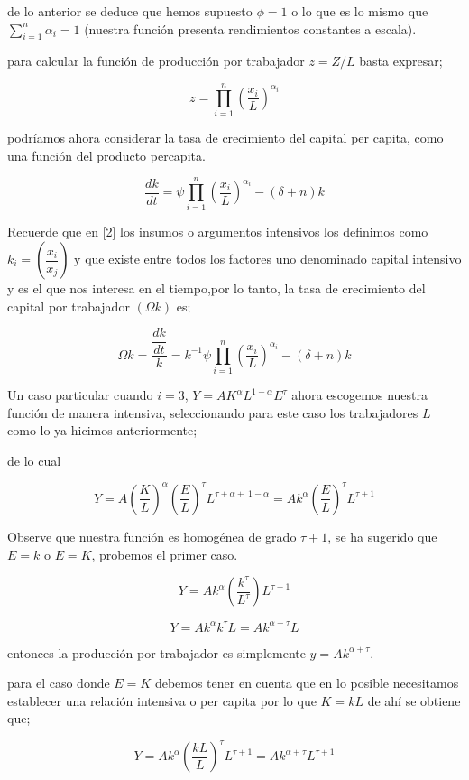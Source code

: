 \documentclass[12pt]{article}
\begin{document}
de lo anterior se deduce que hemos supuesto $\phi=1$ o lo que es lo mismo que $\sum_{i=1}^{n} \alpha_i =1$ (nuestra función presenta rendimientos constantes a escala).

para calcular la función de producción por trabajador $z=Z/L$ basta expresar; 

$$z=\prod_{i=1}^{n}\left(\dfrac{x_i}{L}\right)^{\alpha_i}$$


podríamos ahora considerar la tasa de crecimiento del capital per capita, como una función del producto percapita.

$$
\dfrac{dk}{dt}= \psi \prod_{i=1}^{n}\left(\dfrac{x_i}{L}\right)^{\alpha_i} -(\delta + n)k$$ 


Recuerde que en [2] los insumos o argumentos intensivos los definimos como $k_{i}= \left( \dfrac {x_{i}}{x_{j}} \right)$ y que  existe entre todos los factores uno denominado capital intensivo y es el que nos interesa en el tiempo,por lo tanto, la tasa de crecimiento del capital por trabajador $(\Omega k)$ es; 

$$  \Omega k=\dfrac{\dfrac{dk}{dt}}{k}=  k ^ {- 1 } \psi \prod_{i=1}^{n}\left(\dfrac{x_i}{L}\right)^{\alpha_i} -(\delta + n)k $$



Un caso particular cuando $i=3$, $ Y=AK^{\alpha}L^{1-\alpha}E^\tau$ ahora escogemos nuestra función de manera intensiva, seleccionando para este caso los trabajadores $L$ como lo ya hicimos anteriormente;

de lo cual 

$$Y=A\left(\dfrac{K}{L}\right)^{\alpha}\left(\dfrac{E}{L}\right)^{\tau}L^{\tau + \alpha + \ 1- \alpha}=Ak^\alpha \left(\dfrac{E}{L}\right)^{\tau} L^{\tau + 1}$$

Observe que nuestra función es homogénea de grado $\tau + 1 $, se ha sugerido que $E=k$ o $E=K$, probemos el primer caso.



$$Y=Ak^{\alpha}\left(\dfrac{k^{\tau}}{L^{\tau}} \right) L^{\tau +1}$$

$$ Y= Ak^{\alpha}k^{\tau}L = Ak^{\alpha + \tau}L$$

entonces la producción por trabajador es simplemente $y=Ak^{\alpha + \tau}$.


para el caso donde $E=K$ debemos tener en cuenta que en lo posible necesitamos establecer una relación intensiva o per capita por lo que $K=kL$ de ahí se obtiene que;

$$Y=Ak^{\alpha}\left(\dfrac{kL}{L}\right)^{\tau}L^{\tau + 1} = Ak^{\alpha + \tau } L^{\tau +1 }$$
\end{document}
